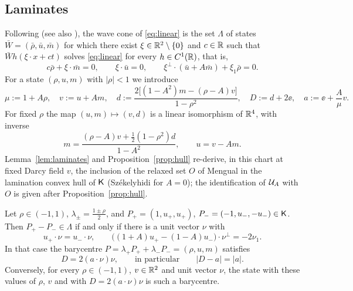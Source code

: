 \subsection{Laminates}
Following \cite{Men22} (see also \cite[Sec.~2.1]{LM26}), the wave cone of \eqref{eq:linear} is the set $\Lambda$ of states $\bar W=(\bar\rho,\bar u,\bar m)$ for which there exist $\xi\in\mathbb{R}^2\setminus\{0\}$ and $c\in\mathbb{R}$ such that $\bar W h(\xi\cdot x+ct)$
solves \eqref{eq:linear} for every $h\in C^1(\mathbb{R})$, that is,
\begin{equation}\label{eq:wavecone}
c\bar\rho+\xi\cdot\bar m=0,\qquad \xi\cdot\bar u=0,\qquad \xi^\perp\cdot(\bar u+A\bar m)+\xi_1\bar\rho=0 .
\end{equation}
For a state $(\rho,u,m)$ with $|\rho|<1$ we introduce
\begin{equation}\label{eq:Da}
\mu:=1+A\rho,\quad v:=u+Am,\quad d:=\frac{2\big[(1-A^2)m-(\rho-A)v\big]}{1-\rho^2},\quad D:=d+2\ee,\quad a:=\ee+\frac A\mu v .
\end{equation}
For fixed $\rho$ the map $(u,m)\mapsto(v,d)$ is a linear isomorphism of $\mathbb{R}^4$, with inverse
\[
m=\frac{(\rho-A)v+\frac12(1-\rho^2)d}{1-A^2},\qquad u=v-Am .
\]
Lemma~\ref{lem:laminates} and Proposition~\ref{prop:hull} re-derive, in this chart at fixed Darcy field $v$, the inclusion of the relaxed set $O$ of Mengual \cite{Men22} in the
lamination convex hull of $\mathsf{K}$ \cite{Men22} (Sz\'ekelyhidi \cite{Sze12} for $A=0$); the identification of $\mathcal{U}_A$ with $O$ is given after Proposition~\ref{prop:hull}.

\begin{lemma}\label{lem:laminates}
Let $\rho\in(-1,1)$, $\lambda_\pm=\frac{1\pm\rho}2$, and $P_+=(1,u_+,u_+)$, $P_-=(-1,u_-,-u_-)\in\mathsf{K}$. Then $P_+-P_-\in\Lambda$ if and only if there is a unit vector $\nu$ with
\begin{equation}\label{eq:laminate-cond}
u_+\cdot\nu=u_-\cdot\nu,\qquad \big((1+A)u_+-(1-A)u_-\big)\cdot\nu^\perp=-2\nu_1 .
\end{equation}
In that case the barycentre $P=\lambda_+P_++\lambda_-P_-=(\rho,u,m)$ satisfies
\begin{equation}\label{eq:D-laminate}
D=2(a\cdot\nu)\nu,\qquad\text{in particular}\qquad |D-a|=|a| .
\end{equation}
Conversely, for every $\rho\in(-1,1)$, $v\in\mathbb{R}^2$ and unit vector $\nu$, the state with these values of $\rho$, $v$ and with $D=2(a\cdot\nu)\nu$ is such a barycentre.
\end{lemma}

